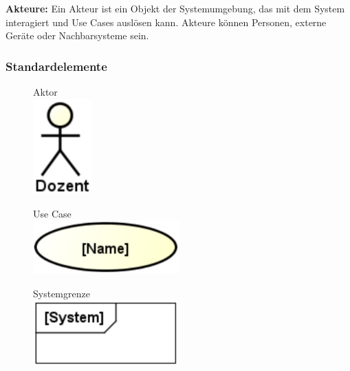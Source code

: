 \documentclass[11pt, a4paper]{article}
\begin{document}
\vspace{1em}

\noindent\textbf{Akteure:} Ein Akteur ist ein Objekt der Systemumgebung, das mit dem System interagiert und Use Cases auslösen kann. Akteure können Personen, externe Geräte oder Nachbarsysteme sein.

\vspace{3em}

\subsubsection{Standardelemente}

\begin{figure}[ht]
    \centering
    \begin{minipage}[t]{0.30\textwidth}
        \centering Aktor \\
        \vspace{1em}
        \centering \includegraphics[width=0.2\textwidth]{UseCase-00.png}
    \end{minipage}
    \centering
    \begin{minipage}[t]{0.30\textwidth}
        \centering Use Case \\
        \vspace{1em}
        \centering \includegraphics[width=0.5\textwidth]{UseCase-01.png}
    \end{minipage}
    \centering
    \begin{minipage}[t]{0.30\textwidth}
        \centering Systemgrenze \\
        \vspace{1em}
        \centering \includegraphics[width=0.5\textwidth]{UseCase-02.png}
    \end{minipage}
\end{figure}
\end{document}
